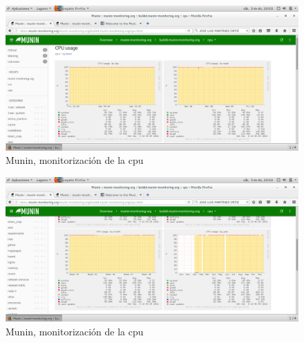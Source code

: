 \begin{figure}[H] %
\centering
\includegraphics[scale=0.4]{./imagenes/P3_6_4.png} 
\caption{Munin, monitorización de la cpu} \label{fig:P3_6_4}
\end{figure}

\begin{figure}[H] %
\centering
\includegraphics[scale=0.4]{./imagenes/P3_6_5.png} 
\caption{Munin, monitorización de la cpu} \label{fig:P3_6_5}
\end{figure}




